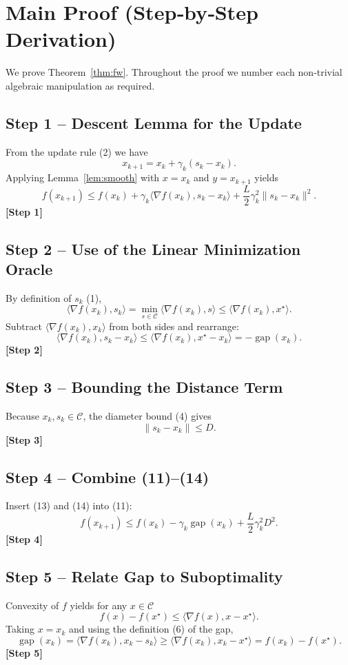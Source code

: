 \documentclass{article}
\newcommand{\gap}{\operatorname{gap}}
\newcommand{\ip}[2]{\langle #1,#2\rangle}
\begin{document}
\section*{Main Proof (Step‑by‑Step Derivation)}
We prove Theorem~\ref{thm:fw}. Throughout the proof we number each non‑trivial algebraic manipulation as required.

\subsection*{Step 1 – Descent Lemma for the Update}
From the update rule (2) we have
\[
x_{k+1}=x_{k}+\gamma_{k}(s_{k}-x_{k}). \tag{10}
\]
Applying Lemma~\ref{lem:smooth} with $x=x_{k}$ and $y=x_{k+1}$ yields
\[
f(x_{k+1})\le f(x_{k})+\gamma_{k}\ip{\nabla f(x_{k})}{s_{k}-x_{k}}
            +\frac{L}{2}\gamma_{k}^{2}\|s_{k}-x_{k}\|^{2}. \tag{11}
\]
\textbf{[Step 1]}

\subsection*{Step 2 – Use of the Linear Minimization Oracle}
By definition of $s_{k}$ (1),
\[
\ip{\nabla f(x_{k})}{s_{k}}=\min_{s\in\mathcal{C}}\ip{\nabla f(x_{k})}{s}
\le \ip{\nabla f(x_{k})}{x^{\star}}. \tag{12}
\]
Subtract $\ip{\nabla f(x_{k})}{x_{k}}$ from both sides and rearrange:
\[
\ip{\nabla f(x_{k})}{s_{k}-x_{k}}
\le \ip{\nabla f(x_{k})}{x^{\star}-x_{k}}
= -\gap(x_{k}). \tag{13}
\]
\textbf{[Step 2]}

\subsection*{Step 3 – Bounding the Distance Term}
Because $x_{k},s_{k}\in\mathcal{C}$, the diameter bound (4) gives
\[
\|s_{k}-x_{k}\|\le D. \tag{14}
\]
\textbf{[Step 3]}

\subsection*{Step 4 – Combine (11)–(14)}
Insert (13) and (14) into (11):
\[
f(x_{k+1})\le f(x_{k})-\gamma_{k}\gap(x_{k})
            +\frac{L}{2}\gamma_{k}^{2}D^{2}. \tag{15}
\]
\textbf{[Step 4]}

\subsection*{Step 5 – Relate Gap to Suboptimality}
Convexity of $f$ yields for any $x\in\mathcal{C}$
\[
f(x)-f(x^{\star})\le \ip{\nabla f(x)}{x-x^{\star}}. \tag{16}
\]
Taking $x=x_{k}$ and using the definition (6) of the gap,
\[
\gap(x_{k})=\ip{\nabla f(x_{k})}{x_{k}-s_{k}}
           \ge \ip{\nabla f(x_{k})}{x_{k}-x^{\star}}
           = f(x_{k})-f(x^{\star}). \tag{17}
\]
\textbf{[Step 5]}
\end{document}
